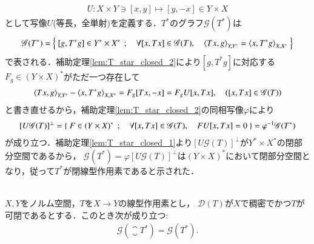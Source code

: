 	\begin{prf}
		\begin{align}
			U : X \times Y \ni [x,y] \longmapsto [y,-x] \in Y \times X
		\end{align}
		として写像$U$(等長，全単射)を定義する．$T^*$のグラフ$\mathscr{G}(T^*)$は
		\begin{align}
			\mathscr{G}(T^*) = \Set{[g,T^*g] \in Y^* \times X^*}{\forall [x,Tx] \in \mathscr{G}(T),\quad \inprod<Tx,g>_{Y,Y^*} = \inprod<x,T^*g>_{X,X^*}}
		\end{align}
		で表される．補助定理\ref{lem:T_star_closed_2}により$[g,T^*g]$に対応する$F_g \in (Y \times X)^*$がただ一つ存在して
		\begin{align}
			\inprod<Tx,g>_{Y,Y^*} - \inprod<x,T^*g>_{X,X^*} = F_g[Tx,-x] = F_gU[x,Tx], \quad ([x,Tx] \in \mathscr{G}(T))
		\end{align}
		と書き直せるから，補助定理\ref{lem:T_star_closed_2}の同相写像$\varphi$により
		\begin{align}
			\left[U\mathscr{G}(T) \right]^{\perp} = \left\{\ F \in (Y \times X)^*\ \, ; \quad \forall [x,Tx] \in \mathscr{G}(T),\quad FU[x,Tx] = 0\ \right\}
			= \varphi^{-1}\mathscr{G}(T^*)
			\label{eq:thm_T_star_closed}
		\end{align}
		が成り立つ．補助定理\ref{lem:T_star_closed_1}より$\left[U\mathscr{G}(T) \right]^{\perp}$が$Y^* \times X^*$の閉部分空間であるから，
		$\mathscr{G}(T^*) = \varphi \left[U\mathscr{G}(T) \right]^{\perp}$は$(Y \times X)^*$において閉部分空間となり，従って$T^*$が閉線型作用素であると示された．
		\QED
	\end{prf}
	
	\begin{screen}
		\begin{thm}[閉拡張の共役作用素は元の共役作用素に一致する]\mbox{}\\
			$X,Y$をノルム空間，$T$を$X \rightarrow Y$の線型作用素とし，
			$\mathscr{D}(T)$が$X$で稠密でかつ$T$が可閉であるとする．このとき次が成り立つ:
			\begin{align}
				\mathscr{G}( \closure{T}^* ) = \mathscr{G}(T^*).
			\end{align}
		\end{thm}
	\end{screen}
	
